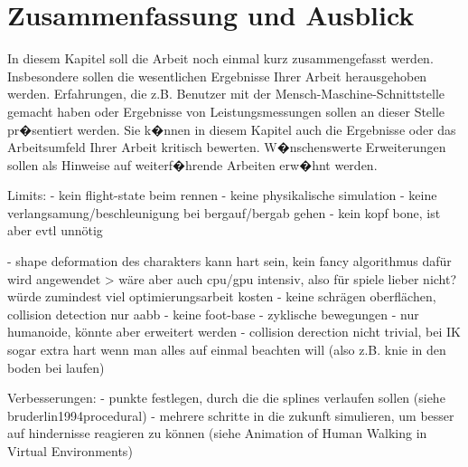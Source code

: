 \chapter{Zusammenfassung und Ausblick}

In diesem Kapitel soll die Arbeit noch einmal kurz zusammengefasst werden. Insbesondere sollen die wesentlichen Ergebnisse Ihrer Arbeit herausgehoben werden. Erfahrungen, die z.B. Benutzer mit der Mensch-Maschine-Schnittstelle gemacht haben oder Ergebnisse von Leistungsmessungen sollen an dieser Stelle pr�sentiert werden. Sie k�nnen in diesem Kapitel auch die Ergebnisse oder das Arbeitsumfeld Ihrer Arbeit kritisch bewerten. W�nschenswerte Erweiterungen sollen als Hinweise auf weiterf�hrende Arbeiten erw�hnt werden.



Limits:
- kein flight-state beim rennen
- keine physikalische simulation
- keine verlangsamung/beschleunigung bei bergauf/bergab gehen
- kein kopf bone, ist aber evtl unnötig

- shape deformation des charakters kann hart sein, kein fancy algorithmus dafür wird angewendet
> wäre aber auch cpu/gpu intensiv, also für spiele lieber nicht? würde zumindest viel optimierungsarbeit kosten
- keine schrägen oberflächen, collision detection nur aabb
- keine foot-base
- zyklische bewegungen
- nur humanoide, könnte aber erweitert werden
- collision derection nicht trivial, bei IK sogar extra hart wenn man alles auf einmal beachten will (also z.B. knie in den boden bei laufen)

Verbesserungen:
- punkte festlegen, durch die die splines verlaufen sollen (siehe bruderlin1994procedural)
- mehrere schritte in die zukunft simulieren, um besser auf hindernisse reagieren zu können (siehe Animation of Human Walking in Virtual Environments)